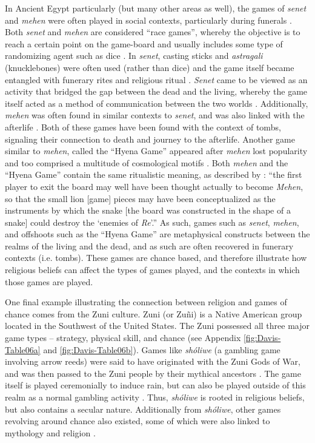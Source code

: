 \documentclass[%
	]{ijsra}
\begin{document}
In Ancient Egypt particularly (but many other areas as well), the games of \textit{senet} and \textit{mehen} were often played in social contexts, particularly during funerals \parencite[34]{kendall2007}. Both \textit{senet} and \textit{mehen} are considered ``race games”, whereby the objective is to reach a certain point on the game-board and usually includes some type of randomizing agent such as dice \parencite[3]{gobet2004}. In \textit{senet}, casting sticks and \textit{astragali} (knucklebones) were often used (rather than dice) and the game itself became entangled with funerary rites and religious ritual \parencites{piccione1980}[58]{piccione2007}. \textit{Senet} came to be viewed as an activity that bridged the gap between the dead and the living, whereby the game itself acted as a method of communication between the two worlds \parencites[59]{piccione2007}{robinson2015}. Additionally, \textit{mehen} was often found in similar contexts to \textit{senet}, and was also linked with the afterlife \parencite[40-41]{kendall2007}. Both of these games have been found with the context of tombs, signaling their connection to death and journey to the afterlife. Another game similar to \textit{mehen}, called the ``Hyena Game” appeared after \textit{mehen} lost popularity and too comprised a multitude of cosmological motifs \parencite[44]{kendall2007}. Both \textit{mehen} and the ``Hyena Game” contain the same ritualistic meaning, as described by \textcite[44]{kendall2007}: ``the first player to exit the board may well have been thought actually to become \textit{Mehen}, so that the small lion [game] pieces may have been conceptualized as the instruments by which the snake [the board was constructed in the shape of a snake] could destroy the ‘enemies of \textit{Re}’.” As such, games such as \textit{senet}, \textit{mehen}, and offshoots such as the ``Hyena Game” are metaphysical constructs between the realms of the living and the dead, and as such are often recovered in funerary contexts (i.e. tombs). These games are chance based, and therefore illustrate how religious beliefs can affect the types of games played, and the contexts in which those games are played. 

One final example illustrating the connection between religion and games of chance comes from the Zuni culture. Zuni (or Zu\~{n}i) is a Native American group located in the Southwest of the United States. The Zuni possessed all three major game types – strategy, physical skill, and chance (see Appendix \cref{fig:Davis-Table06a} and \cref{fig:Davis-Table06b}). Games like \textit{sh\'{o}liwe} (a gambling game involving arrow reeds) were said to have originated with the Zuni Gods of War, and was then passed to the Zuni people by their mythical ancestors \parencite[480]{stevenson1903}. The game itself is played ceremonially to induce rain, but can also be played outside of this realm as a normal gambling activity \parencite[480]{stevenson1903}. Thus, \textit{sh\'{o}liwe} is rooted in religious beliefs, but also contains a secular nature. Additionally from \textit{sh\'{o}liwe}, other games revolving around chance also existed, some of which were also linked to mythology and religion \parencite{stevenson1903}. 
\end{document}
